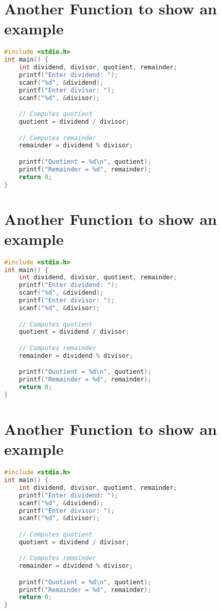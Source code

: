 \section*{Another Function to show an example}
\begin{spacing}{1.0}
{\footnotesize
\begin{lstlisting}[language=C]
#include <stdio.h>
int main() {
    int dividend, divisor, quotient, remainder;
    printf("Enter dividend: ");
    scanf("%d", &dividend);
    printf("Enter divisor: ");
    scanf("%d", &divisor);

    // Computes quotient
    quotient = dividend / divisor;

    // Computes remainder
    remainder = dividend % divisor;

    printf("Quotient = %d\n", quotient);
    printf("Remainder = %d", remainder);
    return 0;
}
\end{lstlisting}
}
\end{spacing}

\section*{Another Function to show an example}
\begin{spacing}{1.0}
{\footnotesize
\begin{lstlisting}[language=C]
#include <stdio.h>
int main() {
    int dividend, divisor, quotient, remainder;
    printf("Enter dividend: ");
    scanf("%d", &dividend);
    printf("Enter divisor: ");
    scanf("%d", &divisor);

    // Computes quotient
    quotient = dividend / divisor;

    // Computes remainder
    remainder = dividend % divisor;

    printf("Quotient = %d\n", quotient);
    printf("Remainder = %d", remainder);
    return 0;
}
\end{lstlisting}
}
\end{spacing}

\section*{Another Function to show an example}
\begin{spacing}{1.0}
{\footnotesize
\begin{lstlisting}[language=C]
#include <stdio.h>
int main() {
    int dividend, divisor, quotient, remainder;
    printf("Enter dividend: ");
    scanf("%d", &dividend);
    printf("Enter divisor: ");
    scanf("%d", &divisor);

    // Computes quotient
    quotient = dividend / divisor;

    // Computes remainder
    remainder = dividend % divisor;

    printf("Quotient = %d\n", quotient);
    printf("Remainder = %d", remainder);
    return 0;
}
\end{lstlisting}
}
\end{spacing}



